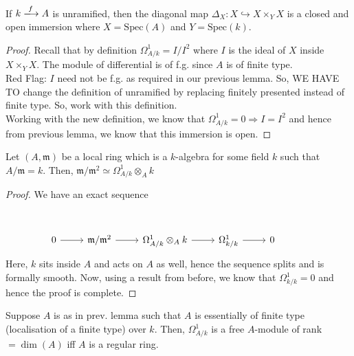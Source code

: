 \documentclass[oneside, 12pt]{scrbook}
\newcommand{\spec}{\mathrm{Spec}}
\newcommand{\m}{\mathfrak{m}}
\theoremstyle{theorem}
\begin{document}
\begin{corollary}
If $k \xlongrightarrow{f} A$ is unramified, then the diagonal map $\Delta_{X}: X \hookrightarrow X \times_{Y} X$ is a closed and open immersion where $X =\spec(A)$ and $Y = \spec(k)$.
\end{corollary}

\begin{proof}
Recall that by definition $\Omega_{A/k}^{1} = I/I^2$ where $I$ is the ideal of $X$ inside $X \times_{Y} X$. The module of differential is of f.g. since $A$ is of finite type.\\

\textcolor{BrickRed}{Red Flag}: $I$ need not be f.g. as required in our previous lemma. So, WE HAVE TO change the definition of unramified by replacing finitely presented instead of finite type. So, work with this definition. \\

Working with the new definition, we know that $\Omega_{A/k}^{1} = 0 \Rightarrow I=I^2$ and hence from previous lemma, we know that this immersion is open.  
\end{proof}

\begin{lemma}
Let $(A, \m)$ be a local ring which is a $k$-algebra for some field $k$ such that $A/\m = k$. Then, $\m / \m^2 \simeq \Omega_{A/k}^{1} \otimes_{A} k $
\end{lemma}

\begin{proof}
We have an exact sequence 
\[\begin{tikzcd}
	&&&&& {} \\
	0 & {\m/\m^2} & {\Omega_{A/k}^{1} \otimes_{A} k } & {\Omega_{k/k}^{1}} & 0
	\arrow[from=2-1, to=2-2]
	\arrow[from=2-2, to=2-3]
	\arrow[from=2-3, to=2-4]
	\arrow[from=2-4, to=2-5]
\end{tikzcd}\]
Here, $k$ sits inside $A$ and acts on $A$ as well, hence the sequence splits and is formally smooth. Now, using a result from before, we know that $\Omega_{k/k}^{1} = 0$ and hence the proof is complete.
\end{proof}

\begin{lemma}
Suppose $A$ is as in prev. lemma such that $A$ is essentially of finite type (localisation of a finite type) over $k$. Then, $\Omega_{A/k}^{1}$ is a free $A$-module of rank$= \dim(A)$ iff $A$ is a regular ring.  
\end{lemma}
\end{document}
